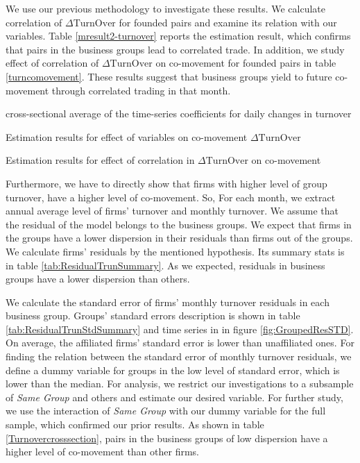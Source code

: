 	We use our previous methodology to investigate these results. We calculate correlation of $ \Delta \text{TurnOver} $ for founded pairs and examine its relation with our variables. Table \ref{mresult2-turnover} reports the estimation result, which confirms that pairs in the business groups lead to correlated trade. In addition, we study effect of  correlation of $ \Delta \text{TurnOver} $ on co-movement for founded pairs in table \ref{turncomovement}. These results suggest that business groups yield to future co-movement through correlated trading in that month.
  
{\begin{table}[htbp]
	\centering
	\caption{cross-sectional average of the time-series coefficients for daily changes in turnover }
	\resizebox{!}{!}{
		
	} \label{turnover}
\end{table}}


	\begin{table}[htbp]
		\centering
		\caption{Estimation results for effect of variables on  co-movement $ \Delta \text{TurnOver} $}
		\label{mresult2-turnover}
		\resizebox{\textwidth}{!}{
			\centering
			
		}
	\end{table}


	\begin{table}[htbp]
		\centering
		\caption{Estimation results for effect of correlation in $ \Delta \text{TurnOver} $ on  co-movement }
		\label{turncomovement}
		\resizebox{\textwidth}{!}{
			\centering
			
		}
	\end{table}




Furthermore, we have to directly show that firms with higher level of group turnover, have a higher level of co-movement. So, For each month, we extract annual average level of firms' turnover and monthly turnover. We assume that the residual of the model belongs to the business groups. We expect that firms in the groups have a lower dispersion in their residuals than firms out of the groups. We calculate firms' residuals by the mentioned hypothesis. Its summary stats is in table \ref{tab:ResidualTrunSummary}. As we expected, residuals in business groups have a lower dispersion than others.


We calculate the standard error of firms' monthly turnover residuals in each business group. Groups' standard errors description is shown in table \ref{tab:ResidualTrunStdSummary} and time series in in figure \ref{fig:GroupedResSTD}. On average, the affiliated firms' standard error is lower than unaffiliated ones. For finding the relation between the standard error of monthly turnover residuals, we define a dummy variable for groups in the low level of standard error, which is lower than the median. For analysis, we restrict our investigations to a subsample of \textit{Same Group} and others and estimate our desired variable.   For further study, we use the interaction of \textit{Same Group} with our dummy variable for the full sample, which confirmed our prior results. As shown in table \ref{Turnovercrosssection}, pairs in the business groups of low dispersion have a higher level of co-movement than other firms.


